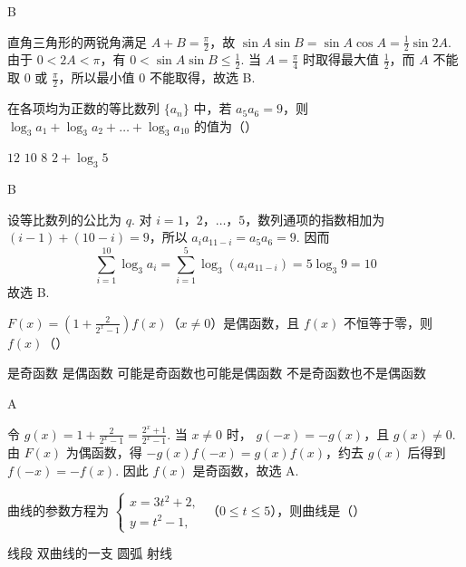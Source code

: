 \begin{answer}
B
\end{answer}

\begin{solution}
直角三角形的两锐角满足 \(A+B=\frac{\pi}{2}\)，故
\(\sin A\sin B=\sin A\cos A=\frac{1}{2}\sin 2A\). 由于
\(0<2A<\pi\)，有 \(0<\sin A\sin B\leqslant\frac{1}{2}\). 当
\(A=\frac{\pi}{4}\) 时取得最大值 \(\frac{1}{2}\)，而 \(A\) 不能取 \(0\) 或
\(\frac{\pi}{2}\)，所以最小值 \(0\) 不能取得，故选 B.
\end{solution}

\begin{problem}
在各项均为正数的等比数列 \(\{a_{n}\}\) 中，若 \(a_{5}a_{6} = 9\)，则 \(\log_{3} a_{1} + \log_{3} a_{2} + \dots + \log_{3} a_{10}\) 的值为（\quad）

\choices
    {\(12\)}
    {\(10\)}
    {\(8\)}
    {\(2 + \log_{3} 5\)}
\end{problem}

\begin{answer}
B
\end{answer}

\begin{solution}
设等比数列的公比为 \(q\). 对 \(i=1\)，\(2\)，\(\dots\)，\(5\)，数列通项的指数相加为
\((i-1)+(10-i)=9\)，所以
\(a_i a_{11-i}=a_5a_6=9\). 因而
\[
\sum_{i=1}^{10}\log_3 a_i
=\sum_{i=1}^{5}\log_3(a_i a_{11-i})
=5\log_3 9=10
\]
故选 B.
\end{solution}

\begin{problem}
\(F(x) = \left(1 + \frac{2}{2^{x} - 1}\right)f(x)\)（\(x \neq 0\)）是偶函数，且 \(f(x)\) 不恒等于零，则 \(f(x)\)（\quad）

\choices
    {是奇函数}
    {是偶函数}
    {可能是奇函数也可能是偶函数}
    {不是奇函数也不是偶函数}
\end{problem}

\begin{answer}
A
\end{answer}

\begin{solution}
令
\(g(x)=1+\frac{2}{2^x-1}=\frac{2^x+1}{2^x-1}\). 当 \(x\neq0\) 时，
\(g(-x)=-g(x)\)，且 \(g(x)\neq0\). 由 \(F(x)\) 为偶函数，得
\(-g(x)f(-x)=g(x)f(x)\)，约去 \(g(x)\) 后得到
\(f(-x)=-f(x)\). 因此 \(f(x)\) 是奇函数，故选 A.
\end{solution}

\begin{problem}
曲线的参数方程为 \(\begin{cases}
x = 3t^2 + 2,\\
y = t^2 - 1,
\end{cases}\) （\(0 \leqslant t \leqslant 5\)），则曲线是（\quad）

\choices
    {线段}
    {双曲线的一支}
    {圆弧}
    {射线}
\end{problem}

